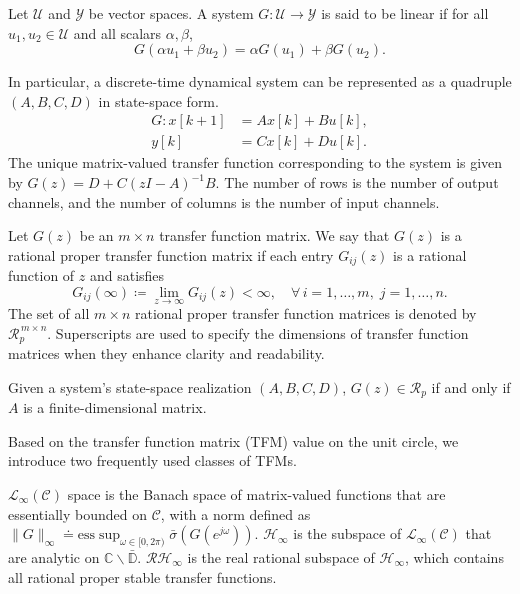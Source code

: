 \begin{defn}
Let $\mathcal U$ and $\mathcal Y$ be vector spaces. A system \(G: \mathcal U \to \mathcal Y\)
is said to be linear if for all $u_1,u_2 \in \mathcal U$ and all scalars
$\alpha,\beta$,
\[
G(\alpha u_1 + \beta u_2)
= \alpha G(u_1) + \beta G(u_2).
\]
\end{defn}
In particular, a discrete-time dynamical system can be represented as a quadruple \((A,B,C,D)\) in state-space form.
\begin{subequations}\label{eq:main}
\begin{align}
G : x[k + 1] &= A x[k] + B u[k], \label{eq:main:a} \\
y[k]     &= C x[k] + D u[k]. \label{eq:main:b}
\end{align}
\end{subequations}
The unique matrix-valued transfer function corresponding to the system is given by \(G(z) = D + C (z I -A)^{-1} B\).
The number of rows is the number of output channels, and the number of columns is the number of input channels.

\begin{defn} 
Let $G(z)$ be an $m\times n$ transfer function matrix.  
We say that $G(z)$ is a rational proper transfer function matrix if each entry
$G_{ij}(z)$ is a rational function of $z$ and satisfies
\[
G_{ij}(\infty) \coloneqq \lim_{z\to\infty} G_{ij}(z) < \infty, \quad \forall\, i=1,\ldots,m,\; j=1,\ldots,n.
\]
The set of all $m\times n$ rational proper transfer function matrices is denoted by
$\mathcal{R}_p^{\,m\times n}$. Superscripts are used to specify the dimensions of transfer function matrices when they enhance clarity and readability.
\end{defn}
\begin{rem}
Given a system's state-space realization \((A,B,C,D)\), \(G(z) \in \mathcal{R}_p\) if and only if \(A\) is a finite-dimensional matrix.
\end{rem}
Based on the transfer function matrix (TFM) value on the unit circle, we introduce two frequently used classes of TFMs.
\begin{defn} \cite{Zhou1996RobustControl} 
\(\mathcal{L}_\infty(\mathcal{C})\) space is the Banach space of matrix-valued functions that are essentially bounded on \(\mathcal{C}\), with a norm defined as \(
\|G\|_{\infty} \doteq \mathrm{ess} \sup_{\omega \in[0,2\pi)} \bar{\sigma}(G(e^{j\omega}))\).
\(\mathcal{H}_\infty\) is the subspace of \(\mathcal{L}_\infty(\mathcal{C})\) that are analytic on \(\mathbb{C} \backslash \bar{\mathbb{D}}\). \(\mathcal{RH}_\infty\) is the real rational subspace of \(\mathcal{H}_\infty\), which contains all rational proper stable transfer functions.
\end{defn}
  

